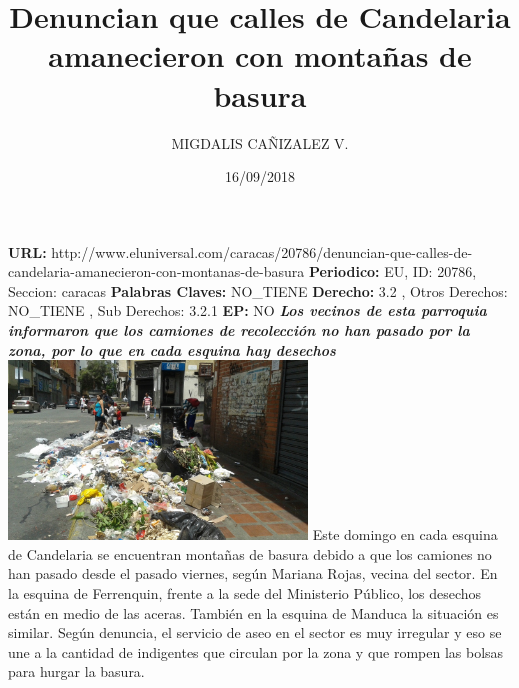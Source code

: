 \documentclass{article}%
\title{\textbf{Denuncian que calles de Candelaria amanecieron con montañas de basura}}%
\author{MIGDALIS CAÑIZALEZ V.}%
\date{16/09/2018}%
\begin{document}
%
\normalsize%
\maketitle%
\textbf{URL: }%
http://www.eluniversal.com/caracas/20786/denuncian{-}que{-}calles{-}de{-}candelaria{-}amanecieron{-}con{-}montanas{-}de{-}basura\newline%
%
\textbf{Periodico: }%
EU, %
ID: %
20786, %
Seccion: %
caracas\newline%
%
\textbf{Palabras Claves: }%
NO\_TIENE\newline%
%
\textbf{Derecho: }%
3.2%
, Otros Derechos: %
NO\_TIENE%
, Sub Derechos: %
3.2.1%
\newline%
%
\textbf{EP: }%
NO\newline%
\newline%
%
\textbf{\textit{Los vecinos de esta parroquia informaron que los camiones de recolección no han  pasado  por la zona, por lo que en cada esquina hay desechos}}%
\newline%
\newline%
%
\includegraphics[width=300px]{23.jpg}%
\newline%
%
Este domingo en cada esquina de Candelaria se encuentran montañas de basura debido a que los camiones no han pasado desde el pasado viernes, según Mariana Rojas, vecina del sector.%
\newline%
%
En la esquina de Ferrenquin, frente a la sede del Ministerio Público, los desechos están en medio de las aceras. También en la esquina de Manduca la situación es similar.%
\newline%
%
Según denuncia, el servicio de aseo en el sector es muy irregular y eso se une a la cantidad de indigentes que circulan por la zona y que rompen las bolsas para hurgar la basura.%
\newline%
%
\end{document}

